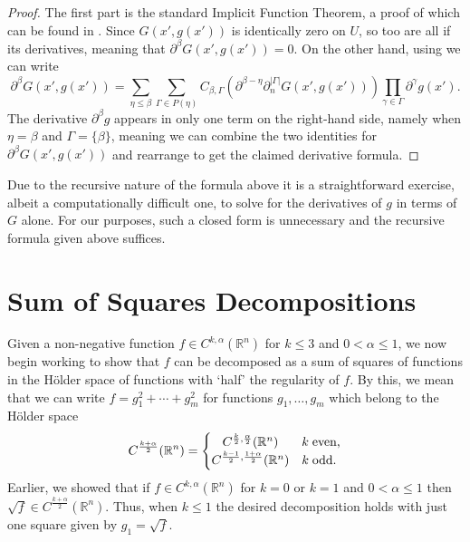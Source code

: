 \documentclass[oneside,hidelinks,indentfirst,10pt]{book}
\begin{document}
\begin{proof}
The first part is the standard Implicit Function Theorem, a proof of which can be found in \cite[Theorem 3.2.1]{IFTref}. Since \(G(x',g(x'))\) is identically zero on \(U\), so too are all if its derivatives, meaning that \(\partial^\beta G(x',g(x'))=0\). On the other hand, using  we can write 
\[
    \partial^\beta G(x',g(x'))=\sum_{\eta\leq\beta}\sum_{\Gamma\in P(\eta)}C_{\beta,\Gamma}(\partial^{\beta-\eta}\partial^{|\Gamma|}_nG(x',g(x')))\prod_{\gamma\in\Gamma}\partial^\gamma g(x').
\]
The derivative \(\partial^\beta g\) appears in only one term on the right-hand side, namely when \(\eta=\beta\) and \(\Gamma=\{\beta\}\), meaning we can combine the two identities for \(\partial^\beta G(x',g(x'))\) and rearrange to get the claimed derivative formula.
\end{proof}


Due to the recursive nature of the formula above it is a straightforward exercise, albeit a computationally difficult one, to solve for the derivatives of \(g\) in terms of \(G\) alone. For our purposes, such a closed form is unnecessary and the recursive formula given above suffices. %
\chapter{Sum of Squares Decompositions}\label{chap:decomps}


Given a non-negative function \(f\in C^{k,\alpha}(\mathbb{R}^n)\) for \(k\leq 3\) and \(0<\alpha\leq 1\), we now begin working to show that \(f\) can be decomposed as a sum of squares of functions in the H\"older space of functions with `half' the regularity of \(f\). By this, we mean that we can write \(f=g_1^2+\cdots+g_m^2\) for functions \(g_1,\dots,g_m\) which belong to the H\"older space
\begin{equation}\label{eq:halfreg}
    C^\frac{k+\alpha}{2}(\mathbb{R}^n)=
    \begin{cases}
    \hfil C^{\frac{k}{2},\frac{\alpha}{2}}(\mathbb{R}^n) & k\;\textrm{even,}\\
    C^{\frac{k-1}{2},\frac{1+\alpha}{2}}(\mathbb{R}^n) & k\;\textrm{odd}.
    \end{cases}    
\end{equation}
Earlier, we showed that if \(f\in C^{k,\alpha}(\mathbb{R}^n)\) for \(k=0\) or \(k=1\) and \(0<\alpha\leq 1\) then \(\sqrt{f}\in C^\frac{k+\alpha}{2}(\mathbb{R}^n)\). Thus, when \(k\leq 1\) the desired decomposition holds with just one square given by \(g_1=\sqrt{f}\). 
\end{document}
